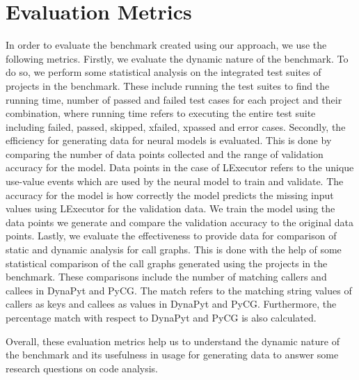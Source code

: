 \section{Evaluation Metrics}
In order to evaluate the benchmark created using our approach, we use the following metrics.
Firstly, we evaluate the dynamic nature of the benchmark.
To do so, we perform some statistical analysis on the integrated test suites of projects in the benchmark.
These include running the test suites to find the running time, number of passed and failed test cases for each project and their combination, where running time refers to executing the entire test suite including failed, passed, skipped, xfailed, xpassed and error cases.
Secondly, the efficiency for generating data for neural models is evaluated.
This is done by comparing the number of data points collected and the range of validation accuracy for the model.
Data points in the case of LExecutor refers to the unique use-value events which are used by the neural model to train and validate.
The accuracy for the model is how correctly the model predicts the missing input values using LExecutor for the validation data.
We train the model using the data points we generate and compare the validation accuracy to the original data points.
Lastly, we evaluate the effectiveness to provide data for comparison of static and dynamic analysis for call graphs.
This is done with the help of some statistical comparison of the call graphs generated using the projects in the benchmark.
These comparisons include the number of matching callers and callees in DynaPyt and PyCG.
The match refers to the matching string values of callers as keys and callees as values in DynaPyt and PyCG. 
Furthermore, the percentage match with respect to DynaPyt and PyCG is also calculated.

Overall, these evaluation metrics help us to understand the dynamic nature of the benchmark and its usefulness in usage for generating data to answer some research questions on code analysis.
